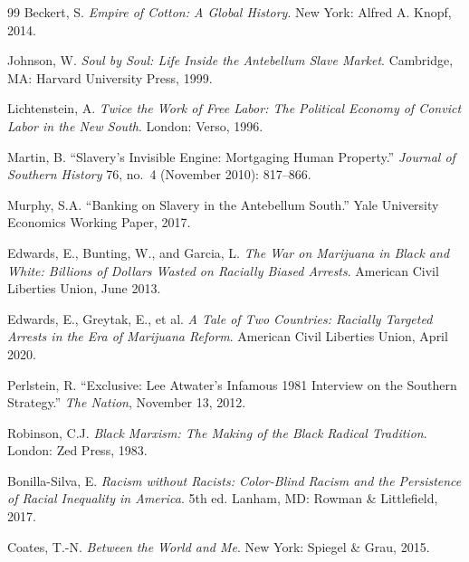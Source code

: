 \documentclass[12pt,openany]{book}
\begin{document}
\begin{thebibliography}{99}
Beckert, S. \textit{Empire of Cotton: A Global History}. New York: Alfred A. Knopf, 2014.

Johnson, W. \textit{Soul by Soul: Life Inside the Antebellum Slave Market}. Cambridge, MA: Harvard University Press, 1999.


Lichtenstein, A. \textit{Twice the Work of Free Labor: The Political Economy of Convict Labor in the New South}. London: Verso, 1996.


Martin, B. ``Slavery's Invisible Engine: Mortgaging Human Property.'' \textit{Journal of Southern History} 76, no.\ 4 (November 2010): 817--866.

Murphy, S.A. ``Banking on Slavery in the Antebellum South.'' Yale University Economics Working Paper, 2017.


Edwards, E., Bunting, W., and Garcia, L. \textit{The War on Marijuana in Black and White: Billions of Dollars Wasted on Racially Biased Arrests}. American Civil Liberties Union, June 2013.

Edwards, E., Greytak, E., et al. \textit{A Tale of Two Countries: Racially Targeted Arrests in the Era of Marijuana Reform}. American Civil Liberties Union, April 2020.


Perlstein, R. ``Exclusive: Lee Atwater's Infamous 1981 Interview on the Southern Strategy.'' \textit{The Nation}, November 13, 2012.


Robinson, C.J. \textit{Black Marxism: The Making of the Black Radical Tradition}. London: Zed Press, 1983.

Bonilla-Silva, E. \textit{Racism without Racists: Color-Blind Racism and the Persistence of Racial Inequality in America}. 5th ed. Lanham, MD: Rowman \& Littlefield, 2017.

Coates, T.-N. \textit{Between the World and Me}. New York: Spiegel \& Grau, 2015.



\end{thebibliography}
\end{document}
